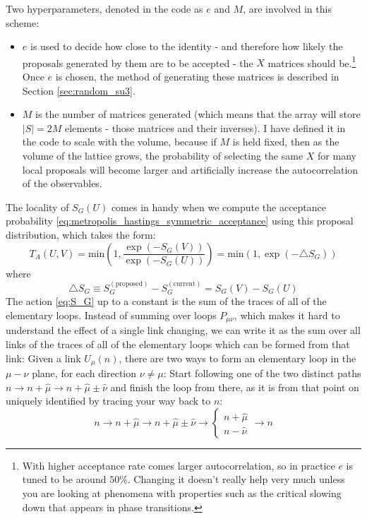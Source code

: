 \documentclass[11pt]{article}
\begin{document}
Two hyperparameters, denoted in the code as $e$ and $M$, are involved in this scheme:
\begin{itemize}
\item $e$ is used to decide how close to the identity - and therefore how likely the proposals generated by them are to be accepted - the $X$ matrices should be.\footnote{With higher acceptance rate comes larger autocorrelation, so in practice $e$ is tuned to be around $50\%$. Changing it doesn't really help very much unless you are looking at phenomena with properties such as the critical slowing down that appears in phase transitions.} Once $e$ is chosen, the method of generating these matrices is described in Section \ref{sec:random_su3}.
\item $M$ is the number of matrices generated (which means that the array will store $|S|=2M$ elements - those matrices and their inverses). I have defined it in the code to scale with the volume, because if $M$ is held fixed, then as the volume of the lattice grows, the probability of selecting the same $X$ for many local proposals will become larger and artificially increase the autocorrelation of the observables.
\end{itemize}
The locality of $S_G(U)$ comes in handy when we compute the acceptance probability \eqref{eq:metropolis_hastings_symmetric_acceptance} using this proposal distribution, which takes the form:
\begin{equation}\label{eq:acceptance_rate_with_action}T_A(U,V)=\mathrm{min}\left(1,\frac{\exp(-S_G(V))}{\exp(-S_G(U))}\right)=\mathrm{min}\left(1,\exp(-\triangle S_G)\right)\end{equation}
where
\begin{equation}\triangle S_G\equiv S_G^{(\mathrm{proposed})}-S_G^{(\mathrm{current})}=S_G(V)-S_G(U)\end{equation}
The action \eqref{eq:S_G} up to a constant is the sum of the traces of all of the elementary loops. Instead of summing over loops $P_{\mu\nu}$, which makes it hard to understand the effect of a single link changing, we can write it as the sum over all links of the traces of all of the elementary loops which can be formed from that link: Given a link $U_\mu(n)$, there are two ways to form an elementary loop in the $\mu-\nu$ plane, for each direction $\nu\neq \mu$: Start following one of the two distinct paths $n\to n+\hat\mu\to n+\hat\mu\pm\hat\nu$ and finish the loop from there, as it is from that point on uniquely identified by tracing your way back to $n$:
\begin{equation}n\to n+\hat\mu\to n+\hat\mu\pm\hat\nu\to\begin{cases}n+\hat\mu\\ n-\hat\nu\end{cases}\to n\end{equation}
\end{document}
